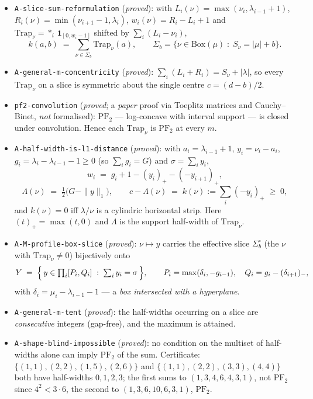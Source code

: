 \documentclass[11pt]{article}
\theoremstyle{plain}
\theoremstyle{definition}
\newcommand{\PFtwo}{\mathrm{PF}_2}
\newcommand{\Trap}{\mathrm{Trap}}
\newcommand{\pospart}[1]{\left(#1\right)_{+}}
\begin{document}
\begin{itemize}
\item \texttt{A-slice-sum-reformulation} (\emph{proved}): with
  $L_i(\nu)=\max(\nu_i,\lambda_{i-1}+1)$, $R_i(\nu)=\min(\nu_{i+1}-1,\lambda_i)$,
  $w_i(\nu)=R_i-L_i+1$ and $\Trap_\nu=\ast_i\,\mathbf 1_{[0,w_i-1]}$ shifted by
  $\sum_i(L_i-\nu_i)$,
  \[
     k(a,b)\;=\;\sum_{\nu\in\Sigma_b}\Trap_\nu(a),\qquad
     \Sigma_b=\{\nu\in\mathrm{Box}(\mu)\;:\;S_\nu=|\mu|+b\}.
  \]
\item \texttt{A-general-m-concentricity} (\emph{proved}): $\sum_i(L_i+R_i)=S_\nu+|\lambda|$,
  so every $\Trap_\nu$ on a slice is symmetric about the single centre $c=(d-b)/2$.
\item \texttt{pf2-convolution} (\emph{proved}; a \emph{paper} proof via Toeplitz matrices
  and Cauchy--Binet, \emph{not} formalised): $\PFtwo$ --- log-concave with interval
  support --- is closed under convolution. Hence each $\Trap_\nu$ is $\PFtwo$ at every $m$.
\item \texttt{A-half-width-is-l1-distance} (\emph{proved}): with
  $a_i=\lambda_{i-1}+1$, $y_i=\nu_i-a_i$, $g_i=\lambda_i-\lambda_{i-1}-1\ge0$
  (so $\sum_i g_i=G$) and $\sigma=\sum_i y_i$,
  \begin{equation}\label{eq:w}
     w_i \;=\; g_i+1-\pospart{y_i}-\pospart{-y_{i+1}},
  \end{equation}
  \begin{equation}\label{eq:Lam}
     \Lambda(\nu)\;=\;\tfrac12\bigl(G-\|y\|_1\bigr),\qquad
     c-\Lambda(\nu)\;=\;k(\nu):=\sum_i\pospart{-y_i}\;\ge\;0,
  \end{equation}
  and $k(\nu)=0$ iff $\lambda/\nu$ is a cylindric horizontal strip. Here
  $\pospart{t}=\max(t,0)$ and $\Lambda$ is the support half-width of $\Trap_\nu$.
\item \texttt{A-M-profile-box-slice} (\emph{proved}): $\nu\mapsto y$ carries the effective
  slice $\Sigma_b^\circ$ (the $\nu$ with $\Trap_\nu\ne0$) bijectively onto
  \begin{equation}\label{eq:Y}
     Y \;=\;\Bigl\{\,y\in\textstyle\prod_i[P_i,Q_i]\;:\;\sum_i y_i=\sigma\,\Bigr\},
     \qquad P_i=\max(\delta_i,-g_{i-1}),\quad Q_i=g_i-(\delta_{i+1})_-,
  \end{equation}
  with $\delta_i=\mu_i-\lambda_{i-1}-1$ --- a \emph{box intersected with a hyperplane}.
\item \texttt{A-general-m-tent} (\emph{proved}): the half-widths occurring on a slice are
  \emph{consecutive} integers (gap-free), and the maximum is attained.
\item \texttt{A-shape-blind-impossible} (\emph{proved}): no condition on the multiset of
  half-widths alone can imply $\PFtwo$ of the sum. Certificate:
  $\{(1,1),(2,2),(1,5),(2,6)\}$ and $\{(1,1),(2,2),(3,3),(4,4)\}$ both have half-widths
  $0,1,2,3$; the first sums to $(1,3,4,6,4,3,1)$, not $\PFtwo$ since $4^2<3\cdot6$, the
  second to $(1,3,6,10,6,3,1)$, $\PFtwo$.
\end{itemize}
\end{document}
